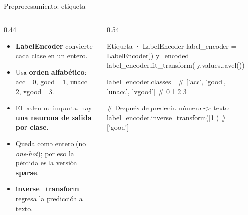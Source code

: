 \documentclass[10pt,aspectratio=169]{beamer}
\begin{document}
\begin{frame}[fragile]{Preprocesamiento: etiqueta}
  \begin{columns}[c]
    \begin{column}{0.44\textwidth}
      \small
      \begin{itemize}
        \setlength{\itemsep}{0.6em}
        \item \textbf{LabelEncoder} convierte cada clase en un entero.
        \item Usa \textbf{orden alfabético}:\\
              acc\,=\,0, good\,=\,1, unacc\,=\,2, vgood\,=\,3.
        \item El orden no importa: hay \textbf{una neurona de salida por clase}.
        \item Queda como entero (no \emph{one-hot}); por eso la pérdida es la
              versión \textbf{sparse}.
        \item \textbf{inverse\_transform} regresa la predicción a texto.
      \end{itemize}
    \end{column}
    \begin{column}{0.54\textwidth}
\begin{codigo}{Etiqueta · LabelEncoder}
label_encoder = LabelEncoder()
y_encoded = label_encoder.fit_transform(
    y.values.ravel())

label_encoder.classes_
# ['acc', 'good', 'unacc', 'vgood']
#    0      1       2        3

# Después de predecir: número -> texto
label_encoder.inverse_transform([1])
# ['good']
\end{codigo}
    \end{column}
  \end{columns}
\end{frame}
\end{document}
